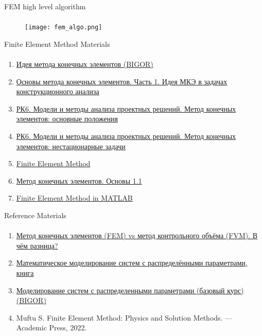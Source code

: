 \documentclass[aspectratio=169]{beamer}
\newcommand{\fbckg}[1]{\usebackgroundtemplate{\texttt{[image: \#1]}}}%
\begin{document}
\begin{frame}[t]{FEM high level algorithm}
\framesubtitle{}
    \vspace{-0.6cm}
    \begin{figure}[H]
        \centering\texttt{[image: fem\_algo.png]}
        \label{fig:fem_algo.png}
    \end{figure}
\end{frame}

\begin{frame}[t]{Finite Element Method Materials}
    \framesubtitle{}
    \scriptsize
    \begin{enumerate}
        \item \href{http://bigor.bmstu.ru/?cnt/?doc=Mkr/id-fem.mod/?cou=Mkr/base.cou}{Идея метода конечных элементов (BIGOR)}
        \item \href{https://www.youtube.com/watch?v=W-llrHRydv8&list=PL0GvilEBvQdZH_PqDTilH9Hmp_--dWB33 }{Основы метода конечных элементов. Часть 1. Идея МКЭ в задачах конструкционного анализа}
        \item \href{https://www.youtube.com/watch?v=BA4iZtRfNxE&list=PLtaqFZsfPcLkas_BCVyqmVFGtNIzm9hg8&index=15}{РК6. Модели и методы анализа проектных решений. Метод конечных элементов: основные положения}
        \item \href{https://www.youtube.com/watch?v=KcrRM_22RjY}{РК6. Модели и методы анализа проектных решений. Метод конечных элементов: нестационарные задачи}
        \item \href{https://youtu.be/P4lBRuY7pC4}{Finite Element Method}
        \item \href{https://www.youtube.com/playlist?list=PL4__wpEQFpcjPZQ76CCcEmBaum5Iky4H3}{Метод конечных элементов. Основы 1.1}
        \item \href{https://www.youtube.com/playlist?list=PLnT2pATp7adU_OYwrPoDWE_YmePxu-fMf}{Finite Element Method in MATLAB}

    \end{enumerate}
\end{frame}

\begin{frame}[t]{Reference Materials}
    \framesubtitle{}
    \begin{enumerate}
        \item \href{https://youtu.be/p1AJqBWYEVE}{Метод конечных элементов (FEM) vs метод контрольного объёма (FVM). В чём разница?}
        \item \href{http://auts.samgtu.ru/sites/auts.samgtu.ru/files/upUSRP.pdf}{Математическое моделирование систем с распределёнными параметрами, книга}
        \item \href{http://bigor.bmstu.ru/?cnt/?doc=Mkr/base.cou}{Моделирование систем с распределенными параметрами (базовый курс) (BIGOR)}
        \item Muftu S. Finite Element Method: Physics and Solution Methods. --- Academic Press, 2022.
    \end{enumerate}
\end{frame}





\fbckg{fibeamer/figs/last_page.png}
\frame[plain]{}
\end{document}
